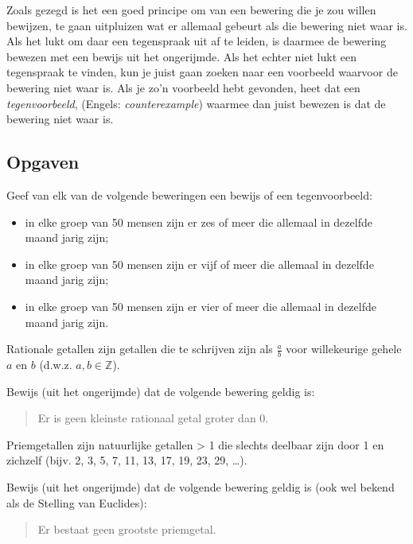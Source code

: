 Zoals gezegd is het een goed principe om van een bewering die je zou willen bewijzen, te gaan uitpluizen wat er allemaal gebeurt als die bewering niet waar is. Als het lukt om daar een tegenspraak uit af te leiden, is daarmee de bewering bewezen met een bewijs uit het ongerijmde. Als het echter niet lukt een tegenspraak te vinden, kun je juist gaan zoeken naar een voorbeeld waarvoor de bewering niet waar is. Als je zo’n voorbeeld hebt gevonden, heet dat een \textit{tegenvoorbeeld}, (Engels: \textit{counterexample}) waarmee dan juist bewezen is dat de bewering niet waar is.

\subsection{Opgaven}
\begin{exercise}[Optioneel]
Geef van elk van de volgende beweringen een bewijs of een tegenvoorbeeld:
\begin{itemize}
\item in elke groep van 50 mensen zijn er zes of meer die allemaal in dezelfde maand jarig zijn;
\item in elke groep van 50 mensen zijn er vijf of meer die allemaal in dezelfde maand jarig zijn;
\item in elke groep van 50 mensen zijn er vier of meer die allemaal in dezelfde maand jarig zijn.
\end{itemize}
\end{exercise}

\begin{exercise}[Optioneel]\label{ex:sqrt:2}
Rationale getallen zijn getallen die te schrijven zijn als $\frac{a}{b}$ voor willekeurige gehele $a$ en $b$ (d.w.z. $a,b \in \mathbb{Z}$).

Bewijs (uit het ongerijmde) dat de volgende bewering geldig is:
\begin{quote}
    Er is geen kleinste rationaal getal groter dan 0.
\end{quote}
\end{exercise}

\begin{exercise}[Optioneel]
Priemgetallen zijn natuurlijke getallen > 1 die slechts deelbaar zijn door 1 en zichzelf (bijv. 2, 3, 5, 7, 11, 13, 17, 19, 23, 29, \ldots).

Bewijs (uit het ongerijmde) dat de volgende bewering geldig is (ook wel bekend als de Stelling van Euclides):
\begin{quote}
    Er bestaat geen grootste priemgetal.
\end{quote}
\end{exercise}

